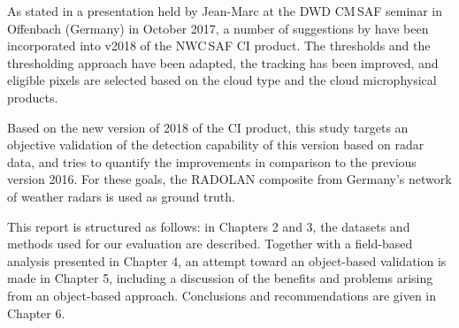 As stated in a presentation held by Jean-Marc  \citep{Mousselin2017} at the DWD CM\,SAF seminar in Offenbach (Germany) in October 2017, a number of suggestions by \citet{Karagiannidis2016} have been incorporated into v2018 of the NWC\,SAF CI product. The thresholds and the thresholding approach have been adapted, the tracking has been improved, and eligible pixels are selected based on the cloud type and the cloud microphysical products. 

Based on the new version of 2018 of the CI product, this study targets an objective validation of  the detection capability of this  version based on radar data, and tries to quantify the improvements in comparison to the previous version 2016. For these goals, the RADOLAN composite from Germany's network of weather radars is used as ground truth.

This report is structured as follows: in Chapters 2 and 3, the datasets and methods used for our evaluation are described. Together with a field-based analysis presented in Chapter 4, an attempt toward an object-based validation is made in Chapter 5, including a discussion of the benefits and problems arising from an object-based approach. Conclusions and recommendations are given in Chapter 6.


